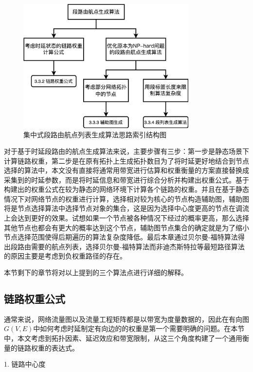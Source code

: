 \begin{figure}[htbp]
\setlength{\abovecaptionskip}{15pt plus 3pt minus 2pt}
\centerline{\includegraphics[width=0.8\textwidth]{./figures/ch3-ark.png}}
\caption{集中式段路由航点列表生成算法思路索引结构图}
\label{fig-ch3-ark}
\end{figure}

对于基于时延段路由的航点生成算法来说，主要步骤有三步：第一步是静态场景下计算链路权重，第二步是在原有拓扑上生成拓扑数目为了将时延更好地结合到节点选择的算法中，本文没有直接将通常用带宽进行估算和权重衡量的方案直接替换成采集到的时延参数，而是将时延信息和带宽进行综合分析并构建出权重公式。基于构建出的权重公式在较为静态的网络环境下计算各个链路的权重。并且在基于静态情况下对网络节点的权重进行计算，选择相对较为核心的节点构造辅助图，辅助图将是节点选择算法中选择节点对象的集合，这是因为选择中心度更高的节点在调流上会达到更好的效果。试想如果一个节点被各种情况下经过的概率更高，那么选择其他节点也都会有更大的概率达到这个节点，辅助图节点集合的确定就是为了缩小节点选择范围使得后期遍历的算法复杂度降低。最后本章通过贝尔曼-福特算法得出段路由需要的航点列表，选择贝尔曼-福特算法而非迪杰斯特拉等最短路径算法的原因主要是考虑到负权重路径的存在。

本节剩下的章节将对以上提到的三个算法点进行详细的解释。

\subsection{链路权重公式}

通常来说，网络流量图以及流量工程矩阵都是以带宽为度量数据的，因此在有向图$G(V, E)$中如何考虑时延制定有向边的的权重是第一个需要明确的问题。在本节中，本文考虑到拓扑因素、延迟效应和带宽限制，从这三个角度构建了一个通用衡量的链路权重的表达式。

1. 链路中心度

